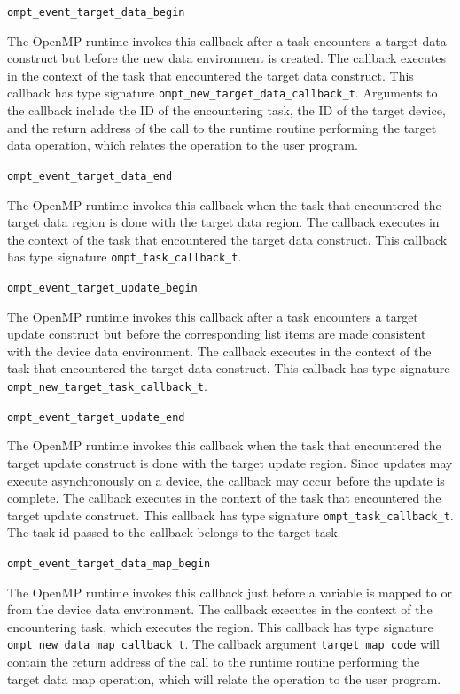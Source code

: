 \documentclass{article}
\begin{document}
\begin{description}

\item \verb|ompt_event_target_data_begin|

  The OpenMP runtime invokes this callback after a task encounters a target data construct but before the new data environment is created.
  The callback executes in the context of the task that encountered the target data construct. 
  This callback has type signature \verb|ompt_new_target_data_callback_t|. Arguments to the callback include the ID of the encountering task, the ID of the 
  target device, and the return address of the call to the runtime routine performing the target data operation, which relates the operation to 
  the user program. 
  
\item \verb|ompt_event_target_data_end|

  The OpenMP runtime invokes this callback when the task that encountered the target data region is 
  done with the target data region. 
  The callback executes in the context of the task that encountered the target data construct.
  This callback has type signature \verb|ompt_task_callback_t|.

\item \verb|ompt_event_target_update_begin|

  The OpenMP runtime invokes this callback after a task encounters a target update construct but before the corresponding
  list items are made consistent with the device data environment.
  The callback executes in the context of the task that encountered the target data construct.
  This callback has type signature \verb|ompt_new_target_task_callback_t|.

\item \verb|ompt_event_target_update_end|

  The OpenMP runtime invokes this callback when the task that encountered the target update construct is 
  done with the target update region. Since updates  may execute asynchronously on a device, the callback may occur before the update  is complete.
  The callback executes in the context of the task that encountered the target update construct.
  This callback has type signature \verb|ompt_task_callback_t|. The task id passed to the callback belongs to the target task.

\item \verb|ompt_event_target_data_map_begin|

  The OpenMP runtime invokes this callback just before a variable is mapped to or from the device data environment.
  The callback executes in the context of the encountering task, which executes the region.
  This callback has type signature \verb|ompt_new_data_map_callback_t|.  The callback argument \verb|target_map_code| will contain the return address of the call to the runtime routine performing the target data map operation, which will relate the operation to the user program. 


\end{description}
\end{document}
